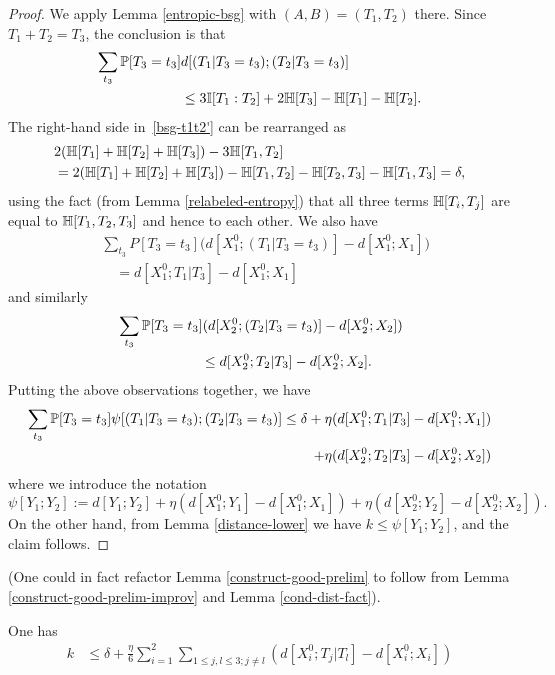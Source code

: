 \begin{proof} \leanok
  We apply Lemma \ref{entropic-bsg} with $(A,B) = (T_1, T_2)$ there.
  Since $T_1 + T_2 = T_3$, the conclusion is that
  \begin{align} \nonumber \sum_{t_3} \mathbb{P}[T_3 = t_3] & d[(T_1 | T_3 = t_3); (T_2 | T_3 = t_3)] \\ & \leq 3 \mathbb{I}[T_1 : T_2] + 2 \mathbb{H}[T_3] - \mathbb{H}[T_1] - \mathbb{H}[T_2].\label{bsg-t1t2'}
  \end{align}
  The right-hand side in~\eqref{bsg-t1t2'} can be rearranged as
  \begin{align*} & 2( \mathbb{H}[T_1] + \mathbb{H}[T_2] + \mathbb{H}[T_3]) - 3 \mathbb{H}[T_1,T_2] \\ & = 2(\mathbb{H}[T_1] + \mathbb{H}[T_2] + \mathbb{H}[T_3]) - \mathbb{H}[T_1,T_2] - \mathbb{H}[T_2,T_3] - \mathbb{H}[T_1, T_3] = \delta,\end{align*}
  using the fact (from Lemma \ref{relabeled-entropy}) that all three terms $\mathbb{H}[T_i,T_j]$ are equal to $\mathbb{H}[T_1,T_2,T_3]$ and hence to each other.
  We also have
  \begin{align*}
  &  \sum_{t_3} P[T_3 = t_3] \bigl(d[X^0_1; (T_1 | T_3=t_3)] - d[X^0_1;X_1]\bigr) \\
  &\quad = d[X^0_1; T_1 | T_3] - d[X^0_1;X_1]
  \end{align*}
  and similarly
  \begin{align*}
  &  \sum_{t_3} \mathbb{P}[T_3 = t_3] (d[X^0_2;(T_2 | T_3=t_3)] - d[X^0_2; X_2]) \\
  &\quad\quad\quad\quad\quad\quad \leq d[X^0_2;T_2|T_3] - d[X^0_2;X_2].
  \end{align*}
  Putting the above observations together, we have
  \begin{align*}
   \sum_{t_3} \mathbb{P}[T_3=t_3] \psi[(T_1 | T_3=t_3); (T_2 | T_3=t_3)] \leq \delta + \eta (d[X^0_1;T_1|T_3]-d[X^0_1;X_1]) \\
     + \eta (d[X^0_2;T_2|T_3]-d[X^0_2;X_2])
   \end{align*}
where we introduce the notation
\[\psi[Y_1; Y_2] := d[Y_1;Y_2] +  \eta (d[X_1^0;Y_1] - d[X_1^0;X_1]) + \eta(d[X_2^0;Y_2] - d[X_2^0;X_2]).\]
On the other hand, from Lemma \ref{distance-lower} we have $k \leq \psi[Y_1;Y_2]$, and the claim follows.
\end{proof}

(One could in fact refactor Lemma \ref{construct-good-prelim} to follow from Lemma \ref{construct-good-prelim-improv} and Lemma \ref{cond-dist-fact}).

\begin{lemma}\label{construct-good-improv}\leanok
One has
\begin{align*}  k & \leq  \delta + \frac{\eta}{6}  \sum_{i=1}^2 \sum_{1 \leq j,l \leq 3; j \neq l} (d[X^0_i;T_j|T_l] - d[X^0_i; X_i])
  \end{align*}
\end{lemma}

